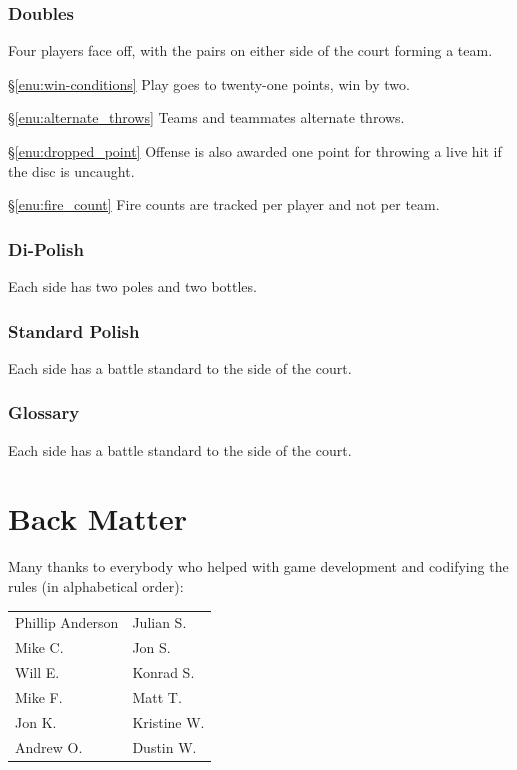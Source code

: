 \documentclass[11pt,letterpaper,twocolumn,english,DIV=calc]{scrartcl}
\begin{document}
\section{Doubles}
Four players face off, with the pairs on either side of the court forming a team. 

\begin{description}
	\item{\S\ref{enu:win-conditions}} Play goes to twenty-one points, win by two.
	\item{\S\ref{enu:alternate_throws}} Teams and teammates alternate throws. 
	\item{\S\ref{enu:dropped_point}} Offense is also awarded one point for throwing a live hit if the disc is uncaught.
	\item{\S\ref{enu:fire_count}} Fire counts are tracked per player and not per team.
\end{description}

\section{Di-Polish}
Each side has two poles and two bottles.

\section{Standard Polish}
Each side has a battle standard to the side of the court.

\section{Glossary}
Each side has a battle standard to the side of the court.

\newpage{}

\part*{Back Matter}


Many thanks to everybody who helped with game development and codifying the rules (in alphabetical order):\medskip{}

\begin{tabular}{>{\raggedright}p{3.5cm}>{\raggedright}p{2.5cm}}
	Phillip Anderson & Julian S.\tabularnewline
	Mike C. & Jon S.\tabularnewline
	Will E. & Konrad S.\tabularnewline
	Mike F. & Matt T.\tabularnewline
	Jon K. & Kristine W.\tabularnewline
	Andrew O. & Dustin W.\tabularnewline
\end{tabular}
\end{document}
